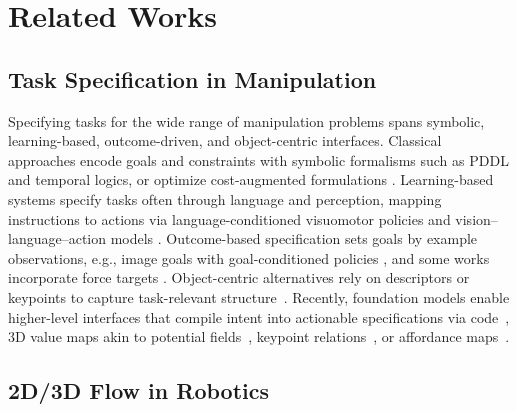 \section{Related Works}
\subsection{Task Specification in Manipulation}

Specifying tasks for the wide range of manipulation problems spans symbolic, learning-based, outcome-driven, and object-centric interfaces. Classical approaches encode goals and constraints with symbolic formalisms such as PDDL and temporal logics, or optimize cost-augmented formulations \cite{garrett2021integrated,zhao2024survey,toussaint2015logic}. Learning-based systems specify tasks often through language and perception, mapping instructions to actions via language-conditioned visuomotor policies and vision–language–action models \cite{shridhar2022cliport,shridhar2023perceiver,zitkovich2023rt,black2024pi_0,kim2025openvla}. Outcome-based specification sets goals by example observations, e.g., image goals with goal-conditioned policies \cite{lynch2020learning,ebert2018visual,black2023zero,xie2018few,sharma2019third,mendonca2021discovering}, and some works incorporate force targets \cite{adeniji2025feel}. Object-centric alternatives rely on descriptors or keypoints to capture task-relevant structure~\cite{simeonov2022neural}. Recently, foundation models enable higher-level interfaces that compile intent into actionable specifications via code~\cite{liang2023code}, 3D value maps akin to potential fields~\cite{huang2023voxposer}, keypoint relations~\cite{huang2025rekep}, or affordance maps~\cite{tang2025uad}.

\subsection{2D/3D Flow in Robotics}


